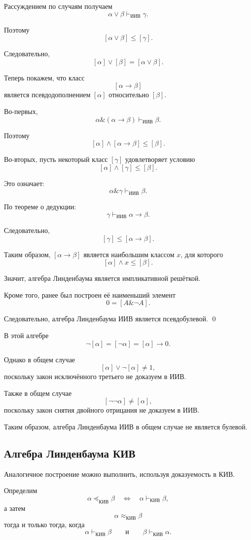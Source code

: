 \documentclass[12pt,a4paper,oneside,openany]{book}
\theoremstyle{definition}
\theoremstyle{plain}
\theoremstyle{remark}
\begin{document}
Рассуждением по случаям получаем
\[
\alpha\lor\beta
\vdash_{\mathrm{ИИВ}}
\gamma.
\]

Поэтому
\[
[\alpha\lor\beta]\leq[\gamma].
\]

Следовательно,
\[
[\alpha]\vee[\beta]
=
[\alpha\lor\beta].
\]

Теперь покажем, что класс
\[
[\alpha\to\beta]
\]
является псевдодополнением \([\alpha]\) относительно \([\beta]\).

Во-первых,
\[
\alpha\mathbin{\&}(\alpha\to\beta)
\vdash_{\mathrm{ИИВ}}
\beta.
\]

Поэтому
\[
[\alpha]\wedge[\alpha\to\beta]
\leq
[\beta].
\]

Во-вторых, пусть некоторый класс \([\gamma]\) удовлетворяет условию
\[
[\alpha]\wedge[\gamma]\leq[\beta].
\]

Это означает:
\[
\alpha\mathbin{\&}\gamma
\vdash_{\mathrm{ИИВ}}
\beta.
\]

По теореме о дедукции:
\[
\gamma
\vdash_{\mathrm{ИИВ}}
\alpha\to\beta.
\]

Следовательно,
\[
[\gamma]\leq[\alpha\to\beta].
\]

Таким образом, \([\alpha\to\beta]\) является наибольшим классом \(x\),
для которого
\[
[\alpha]\wedge x\leq[\beta].
\]

Значит, алгебра Линденбаума является импликативной решёткой.

Кроме того, ранее был построен её наименьший элемент
\[
0=[A\mathbin{\&}\neg A].
\]

Следовательно, алгебра Линденбаума ИИВ является псевдобулевой.
\qed

В этой алгебре
\[
\neg[\alpha]
=
[\neg\alpha]
=
[\alpha]\to0.
\]

Однако в общем случае
\[
[\alpha]\vee\neg[\alpha]\neq1,
\]
поскольку закон исключённого третьего не доказуем в ИИВ.

Также в общем случае
\[
[\neg\neg\alpha]\neq[\alpha],
\]
поскольку закон снятия двойного отрицания не доказуем в ИИВ.

Таким образом, алгебра Линденбаума ИИВ в общем случае не является
булевой.

\subsection{Алгебра Линденбаума КИВ}

Аналогичное построение можно выполнить, используя доказуемость в КИВ.

Определим
\[
\alpha\preccurlyeq_{\mathrm{КИВ}}\beta
\quad\Longleftrightarrow\quad
\alpha\vdash_{\mathrm{КИВ}}\beta,
\]
а затем
\[
\alpha\approx_{\mathrm{КИВ}}\beta
\]
тогда и только тогда, когда
\[
\alpha\vdash_{\mathrm{КИВ}}\beta
\qquad\text{и}\qquad
\beta\vdash_{\mathrm{КИВ}}\alpha.
\]
\end{document}
